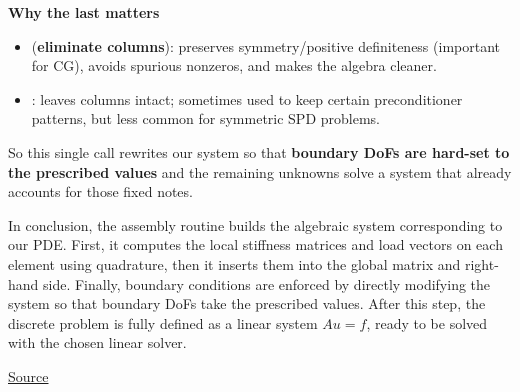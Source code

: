 \begin{itemize}
    \textcolor{Green3}{ \textbf{Why the last  matters}}
    \begin{itemize}
        \item {} (\textbf{eliminate columns}): preserves symmetry/positive definiteness (important for CG), avoids spurious nonzeros, and makes the algebra cleaner.
        \item {}: leaves columns intact; sometimes used to keep certain preconditioner patterns, but less common for symmetric SPD problems.
    \end{itemize}
    So this single call rewrites our system so that \textbf{boundary DoFs are hard-set to the prescribed values} and the remaining unknowns solve a system that already accounts for those fixed notes.
\end{itemize}
In conclusion, the assembly routine builds the algebraic system corresponding to our PDE. First, it computes the local stiffness matrices and load vectors on each element using quadrature, then it inserts them into the global matrix and right-hand side. Finally, boundary conditions are enforced by directly modifying the system so that boundary DoFs take the prescribed values. After this step, the discrete problem is fully defined as a linear system $Au = f$, ready to be solved with the chosen linear solver.

\begin{center}
    \href{https://gist.github.com/AndreVale69/f04f312da68d16c253f46493ae7eaf24#file-poisson1d-cpp}{ Source}
    \hspace{1em}
\end{center}
